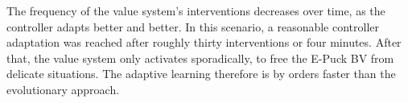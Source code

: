 \documentclass[a4paper]{jacow}
\begin{document}
The frequency of the value system's interventions decreases over time, as the controller adapts better and better. In this scenario, a reasonable controller adaptation was reached after roughly thirty interventions or four minutes. After that, the value system only activates sporadically, to free the E-Puck BV from delicate situations. The adaptive learning therefore is by orders faster than the evolutionary approach.
\end{document}
